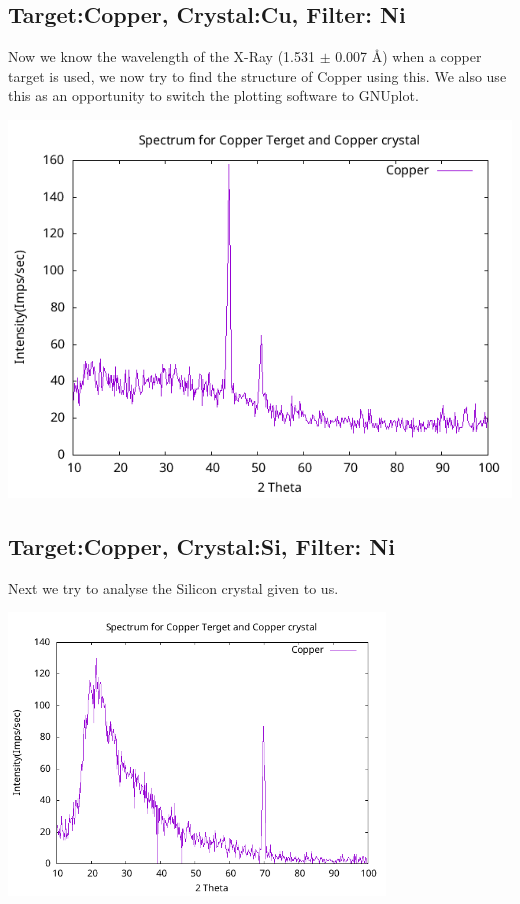 \documentclass[]{report}[12 pt]
\begin{document}
\subsection*{Target:Copper, Crystal:Cu, Filter: Ni}
Now we know the wavelength of the X-Ray (1.531 $\pm$ 0.007 {\AA}) when a copper target is used, we now try to find the structure of Copper using this. We also use this as an opportunity to switch the plotting software to GNUplot.
\begin{center}
	\includegraphics[width=10 cm]{cucu.png}
\end{center}

\subsection*{Target:Copper, Crystal:Si, Filter: Ni}
Next we try to analyse the Silicon crystal given to us.
\begin{center}
	\includegraphics[width=10cm]{cusi.png}
\end{center}
\end{document}
